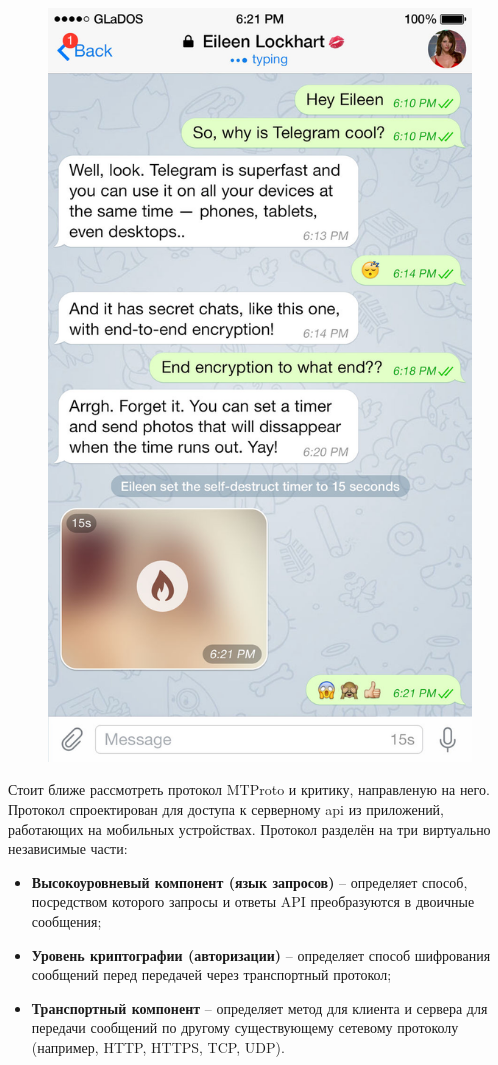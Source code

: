 \begin{figure}[h]
\begin{minipage}{.5\textwidth}
  \label{sec:analysis:research:analogs:telegram:dialogues}
\end{minipage}%
\begin{minipage}{.5\textwidth}
  \centering
  \includegraphics[width=.8\linewidth]{inc/img/tg-secretchat.jpg}
  \label{sec:analysis:research:analogs:telegram:secretchat}
\end{minipage}
\end{figure}

Стоит ближе рассмотреть протокол MTProto и критику, направленую на него. Протокол спроектирован для доступа к серверному \gls{api} из приложений, работающих на мобильных устройствах. 
Протокол разделён на три виртуально независимые части: 
\begin{itemize}
	\item \textbf{Высокоуровневый компонент (язык запросов)} -- определяет способ, посредством которого запросы и ответы API преобразуются в двоичные сообщения;
	\item \textbf{Уровень криптографии (авторизации)} -- определяет способ шифрования сообщений перед передачей через транспортный протокол;
	\item \textbf{Транспортный компонент} -- определяет метод для клиента и сервера для передачи сообщений по другому существующему сетевому протоколу (например, HTTP, HTTPS, TCP, UDP).
\end{itemize}

